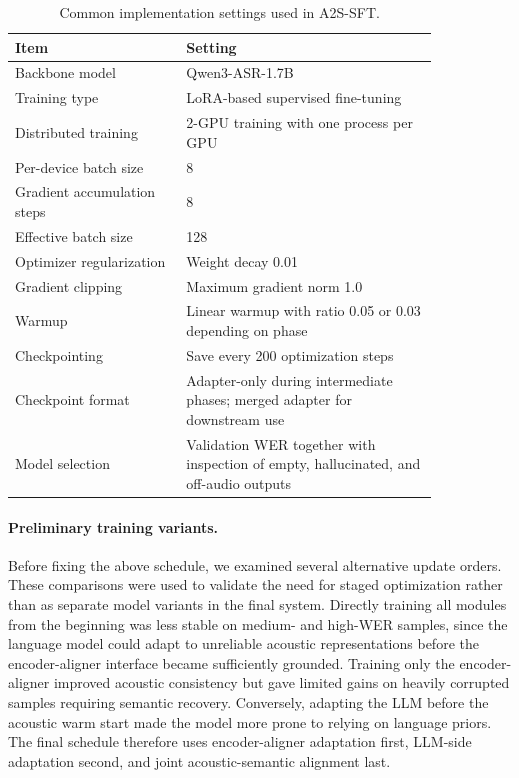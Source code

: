\documentclass{article}
\begin{document}
\begin{table}[t]
\centering
\small
\caption{
Common implementation settings used in A2S-SFT.
}
\label{tab:a2s_sft_common_settings}
\renewcommand{\arraystretch}{1.12}
\begin{tabular}{p{0.34\linewidth} p{0.50\linewidth}}
\toprule
\textbf{Item} & \textbf{Setting} \\
\midrule
Backbone model
& Qwen3-ASR-1.7B \\

Training type
& LoRA-based supervised fine-tuning \\

Distributed training
& 2-GPU training with one process per GPU \\

Per-device batch size
& 8 \\

Gradient accumulation steps
& 8 \\

Effective batch size
& 128 \\

Optimizer regularization
& Weight decay 0.01 \\

Gradient clipping
& Maximum gradient norm 1.0 \\

Warmup
& Linear warmup with ratio 0.05 or 0.03 depending on phase \\

Checkpointing
& Save every 200 optimization steps \\

Checkpoint format
& Adapter-only during intermediate phases; merged adapter for downstream use \\

Model selection
& Validation WER together with inspection of empty, hallucinated, and off-audio
outputs \\
\bottomrule
\end{tabular}
\vspace{-2mm}
\end{table}

\paragraph{Preliminary training variants.}
Before fixing the above schedule, we examined several alternative update orders.
These comparisons were used to validate the need for staged optimization rather
than as separate model variants in the final system. Directly training all modules
from the beginning was less stable on medium- and high-WER samples, since the
language model could adapt to unreliable acoustic representations before the
encoder-aligner interface became sufficiently grounded. Training only the
encoder-aligner improved acoustic consistency but gave limited gains on heavily
corrupted samples requiring semantic recovery. Conversely, adapting the LLM before
the acoustic warm start made the model more prone to relying on language priors.
The final schedule therefore uses encoder-aligner adaptation first, LLM-side
adaptation second, and joint acoustic-semantic alignment last.
\end{document}
